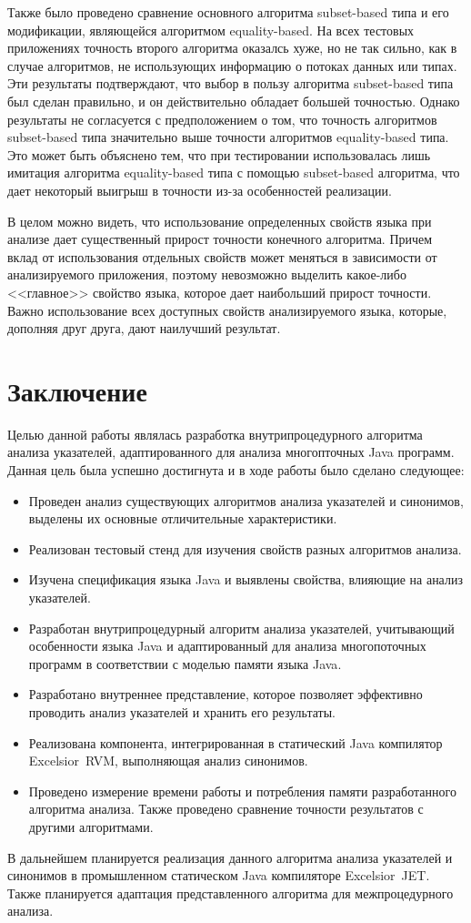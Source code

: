 \documentclass[14pt,titlepage]{extarticle}
\newcommand{\eng}[1]{{\English#1}}
\let\oldsection\section
\renewcommand{\section}{\newpage\oldsection}
\newcommand{\sectionwithoutnumber}[1]{
  \section*{#1}
  \addcontentsline{toc}{section}{#1}
}
\newcommand{\java}{\eng{Java}\xspace}
\begin{document}
      Также было проведено сравнение основного алгоритма \eng{subset-based}
      типа и его модификации, являющейся алгоритмом \eng{equality-based}. На
      всех тестовых приложениях точность второго алгоритма оказалсь хуже, но не
      так сильно, как в случае алгоритмов, не использующих информацию о потоках
      данных или типах. Эти результаты подтверждают, что выбор в пользу
      алгоритма \eng{subset-based} типа был сделан правильно, и он
      действительно обладает большей точностью. Однако результаты не
      согласуется с предположением о том, что точность алгоритмов
      \eng{subset-based} типа значительно выше точности алгоритмов
      \eng{equality-based} типа. Это может быть объяснено тем, что при
      тестировании использовалась лишь имитация алгоритма \eng{equality-based}
      типа с помощью \eng{subset-based} алгоритма, что дает некоторый выигрыш
      в точности из-за особенностей реализации.

      В целом можно видеть, что использование определенных свойств языка при
      анализе дает существенный прирост точности конечного алгоритма. Причем
      вклад от использования отдельных свойств может меняться в зависимости от
      анализируемого приложения, поэтому невозможно выделить какое-либо
      <<главное>> свойство языка, которое дает наибольший прирост точности.
      Важно использование всех доступных свойств анализируемого языка, которые,
      дополняя друг друга, дают наилучший результат.


  \sectionwithoutnumber{Заключение}

    Целью данной работы являлась разработка внутрипроцедурного алгоритма
    анализа указателей, адаптированного для анализа многопточных \java программ.
    Данная цель была успешно достигнута и в ходе работы было сделано следующее:
    \begin{itemize}
      \item Проведен анализ существующих алгоритмов анализа указателей и
            синонимов, выделены их основные отличительные характеристики.
      \item Реализован тестовый стенд для изучения свойств разных алгоритмов
            анализа.
      \item Изучена спецификация языка \java и выявлены свойства, влияющие на
            анализ указателей.
      \item Разработан внутрипроцедурный алгоритм анализа указателей,
            учитывающий особенности языка \java и адаптированный для анализа
            многопоточных программ в соответствии с моделью памяти языка \java.
      \item Разработано внутреннее представление, которое позволяет эффективно
            проводить анализ указателей и хранить его результаты.
      \item Реализована компонента, интегрированная в статический \java
            компилятор \eng{Excelsior~RVM}, выполняющая анализ синонимов.
      \item Проведено измерение времени работы и потребления памяти
            разработанного алгоритма анализа. Также проведено сравнение
            точности результатов с другими алгоритмами.
    \end{itemize}

    В дальнейшем планируется реализация данного алгоритма анализа указателей и
    синонимов в промышленном статическом \java компиляторе \eng{Excelsior~JET}.
    Также планируется адаптация представленного алгоритма для межпроцедурного
    анализа.

  \newpage
  
\end{document}
